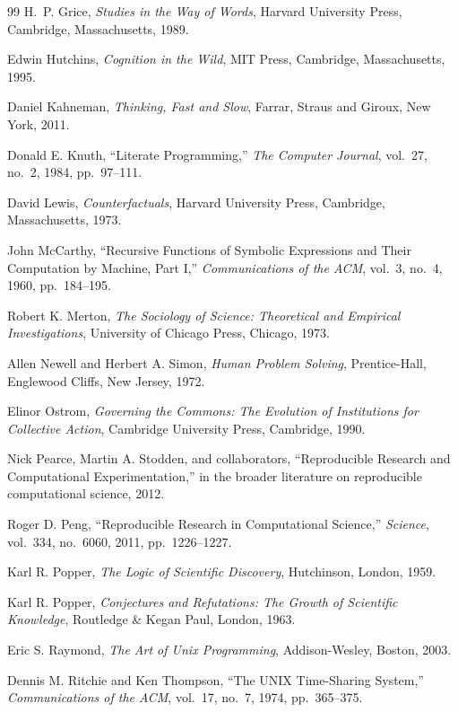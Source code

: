 \documentclass[11pt]{article}
\begin{document}
\begin{thebibliography}{99}
H.~P. Grice,
\textit{Studies in the Way of Words},
Harvard University Press,
Cambridge, Massachusetts,
1989.

Edwin Hutchins,
\textit{Cognition in the Wild},
MIT Press,
Cambridge, Massachusetts,
1995.

Daniel Kahneman,
\textit{Thinking, Fast and Slow},
Farrar, Straus and Giroux,
New York,
2011.

Donald E. Knuth,
``Literate Programming,''
\textit{The Computer Journal},
vol.~27,
no.~2,
1984,
pp.~97--111.

David Lewis,
\textit{Counterfactuals},
Harvard University Press,
Cambridge, Massachusetts,
1973.

John McCarthy,
``Recursive Functions of Symbolic Expressions and Their Computation by Machine, Part I,''
\textit{Communications of the ACM},
vol.~3,
no.~4,
1960,
pp.~184--195.

Robert K. Merton,
\textit{The Sociology of Science: Theoretical and Empirical Investigations},
University of Chicago Press,
Chicago,
1973.

Allen Newell and Herbert A. Simon,
\textit{Human Problem Solving},
Prentice-Hall,
Englewood Cliffs, New Jersey,
1972.

Elinor Ostrom,
\textit{Governing the Commons: The Evolution of Institutions for Collective Action},
Cambridge University Press,
Cambridge,
1990.

Nick Pearce,
Martin A. Stodden,
and collaborators,
``Reproducible Research and Computational Experimentation,''
in the broader literature on reproducible computational science,
2012.

Roger D. Peng,
``Reproducible Research in Computational Science,''
\textit{Science},
vol.~334,
no.~6060,
2011,
pp.~1226--1227.

Karl R. Popper,
\textit{The Logic of Scientific Discovery},
Hutchinson,
London,
1959.

Karl R. Popper,
\textit{Conjectures and Refutations: The Growth of Scientific Knowledge},
Routledge \& Kegan Paul,
London,
1963.

Eric S. Raymond,
\textit{The Art of Unix Programming},
Addison-Wesley,
Boston,
2003.

Dennis M. Ritchie and Ken Thompson,
``The UNIX Time-Sharing System,''
\textit{Communications of the ACM},
vol.~17,
no.~7,
1974,
pp.~365--375.


\end{thebibliography}
\end{document}
